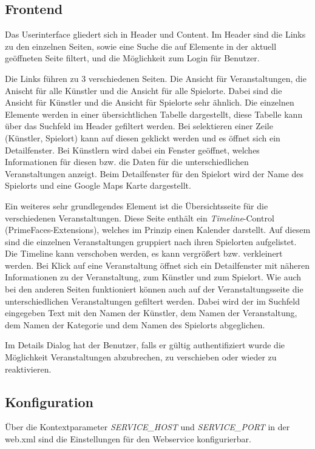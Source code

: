 \documentclass[a4paper,ngerman]{scrartcl}
\begin{document}
\newpage
\subsection{Frontend}
Das Userinterface gliedert sich in Header und Content. Im Header sind die Links zu den einzelnen Seiten, sowie eine Suche die auf Elemente in der aktuell geöffneten Seite filtert, und die Möglichkeit zum Login für Benutzer.

Die Links führen zu 3 verschiedenen Seiten. Die Ansicht für Veranstaltungen, die Anischt für alle Künstler und die Ansicht für alle Spielorte. Dabei sind die Ansicht für Künstler und die Ansicht für Spielorte sehr ähnlich. Die einzelnen Elemente werden in einer übersichtlichen Tabelle dargestellt, diese Tabelle kann über das Suchfeld im Header gefiltert werden. Bei selektieren einer Zeile (Künstler, Spielort) kann auf diesen geklickt werden und es öffnet sich ein Detailfenster. Bei Künstlern wird dabei ein Fenster geöffnet, welches Informationen für diesen bzw. die Daten für die unterschiedlichen Veranstaltungen anzeigt. Beim Detailfenster für den Spielort wird der Name des Spielorts und eine Google Maps Karte dargestellt. 

Ein weiteres sehr grundlegendes Element ist die Übersichtsseite für die verschiedenen Veranstaltungen. Diese Seite enthält ein \textit{Timeline}-Control (PrimeFaces-Extensions), welches im Prinzip einen Kalender darstellt. Auf diesem sind die einzelnen Veranstaltungen gruppiert nach ihren Spielorten aufgelistet. Die Timeline kann verschoben werden, es kann vergrößert bzw. verkleinert werden. Bei Klick auf eine Veranstaltung öffnet sich ein Detailfenster mit näheren Informationen zu der Veranstaltung, zum Künstler und zum Spielort. Wie auch bei den anderen Seiten funktioniert können auch auf der Veranstaltungsseite die unterschiedlichen Veranstaltungen gefiltert werden. Dabei wird der im Suchfeld eingegeben Text mit den Namen der Künstler, dem Namen der Veranstaltung, dem Namen der Kategorie und dem Namen des Spielorts abgeglichen. 

Im Details Dialog hat der Benutzer, falls er gültig authentifiziert wurde die Möglichkeit Veranstaltungen abzubrechen, zu verschieben oder wieder zu reaktivieren.

\subsection{Konfiguration}
Über die Kontextparameter \textit{SERVICE\_HOST} und \textit{SERVICE\_PORT} in der web.xml sind die Einstellungen für den Webservice konfigurierbar.
\end{document}
